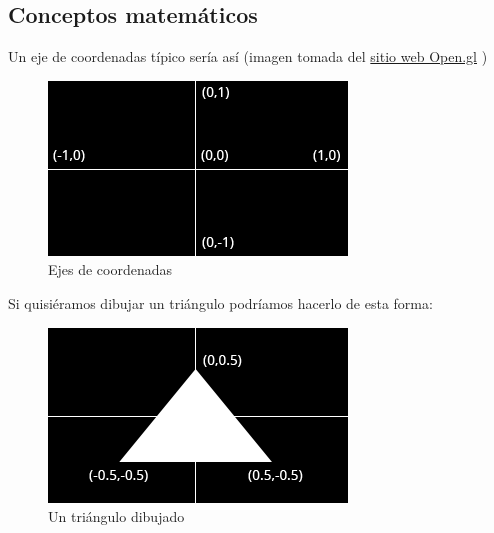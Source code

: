 \documentclass[a4paper,12pt,spanish]{sphinxmanual}
\begin{document}
\subsection{Conceptos matemáticos}
\label{tema2:conceptos-matematicos}
Un eje de coordenadas típico sería así (imagen tomada del \href{http://open.go}{sitio web Open.gl} )
\begin{figure}[htbp]
\centering
\capstart

\includegraphics{ejes.png}
\caption{Ejes de coordenadas}\end{figure}

Si quisiéramos dibujar un triángulo podríamos hacerlo de esta forma:
\begin{figure}[htbp]
\centering
\capstart

\includegraphics{triangulo.png}
\caption{Un triángulo dibujado}\end{figure}
\end{document}
